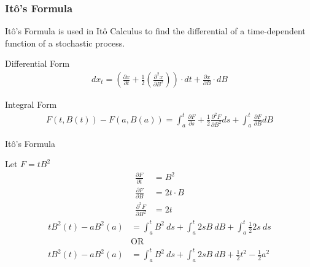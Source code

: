 \begin{frame}
\frametitle{It\^o's Formula}
It\^o's Formula is used in It\^o Calculus to find the differential of a time-dependent function of a stochastic process.
\vfill

		 \begin{block}{Differential Form}
      \begin{align*}
				\displaystyle dx_t =\left(\frac{\partial x}{\partial t} + \frac{1}{2} \left(\frac{\partial ^2 x}{\partial B ^2}\right)\right) \cdot  dt + \frac{\partial x}{\partial B} \cdot dB 
			\end{align*}
    \end{block}
		
\vfill

		\begin{block}{Integral Form}
      \begin{align*}
				\displaystyle F(t, B(t))-F(a,B(a))=
 \int_{a}^{t} \frac{\partial F}{\partial s} + \frac{1}{2} \frac{\partial^2 F}{\partial B^2}ds+
 \int_a^t \frac{\partial F}{\partial B} dB
			\end{align*}
    \end{block}

\vfill
\end{frame}

\begin{frame}{It\^o's Formula} 

Let $F=tB^2$ 
\begin{align*}
\displaystyle
\frac{\partial F}{\partial t}&= B^2\\
\frac{\partial F}{\partial B}&=2t \cdot B\\ 
\frac{\partial^2 F}{\partial B^2}&=2t
\end{align*}
\begin{align*}
tB^2(t)-aB^2(a) &=\int_{a}^{t}B^2 ~ ds+ \int_{a}^{t}2sB ~ dB+\int_a^t \frac{1}{2}2s ~ ds\\
 &\text{OR}\\
tB^2(t)-aB^2(a) &= \int_a^t B^2 ~ ds+ \int_a^t 2sB ~ dB+ \frac{1}{2} t^2- \frac{1}{2}a^2
\end{align*}
\end{frame}


